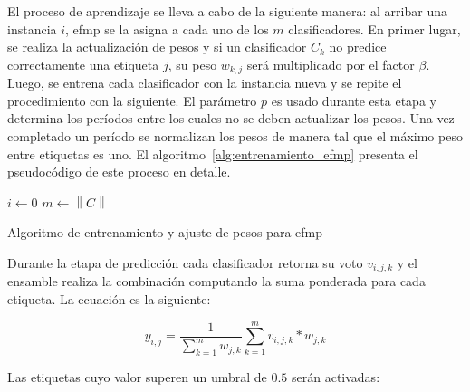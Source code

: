 El proceso de aprendizaje se lleva a cabo de la siguiente manera: al arribar una
instancia $i$, \acrshort{efmp} se la asigna a cada uno de los $m$
clasificadores. En primer lugar, se realiza la actualización de pesos y si un
clasificador $C_{k}$ no predice correctamente una etiqueta $j$, su peso
$w_{k,j}$ será multiplicado por el factor $\beta$. Luego, se entrena cada
clasificador con la instancia nueva y se repite el procedimiento con la
siguiente. El parámetro $p$ es usado durante esta etapa y determina los períodos
entre los cuales no se deben actualizar los pesos. Una vez completado un período
se normalizan los pesos de manera tal que el máximo peso entre etiquetas es uno.
El algoritmo~\ref{alg:entrenamiento_efmp} presenta el pseudocódigo de este
proceso en detalle.

\begin{center}
	\begin{algorithm}[H]
		\label{alg:entrenamiento_efmp}
		\SetAlgoLined
		\DontPrintSemicolon
		$i \gets 0$ \;
		$m \gets \left\|C\right\|$ \;
		\caption{Algoritmo de entrenamiento y ajuste de pesos para \acrfull{efmp}}
	\end{algorithm}
\end{center}

Durante la etapa de predicción cada clasificador retorna su voto $v_{i,j,k}$ y
el ensamble realiza la combinación computando la suma ponderada para cada
etiqueta. La ecuación es la siguiente:

\begin{equation}
	y_{i,j} = \frac{1}{\sum_{k=1}^{m} w_{j,k}} \sum_{k=1}^{m} v_{i,j,k} *
	w_{j,k}
\end{equation}

Las etiquetas cuyo valor superen un umbral de $0.5$ serán activadas:

